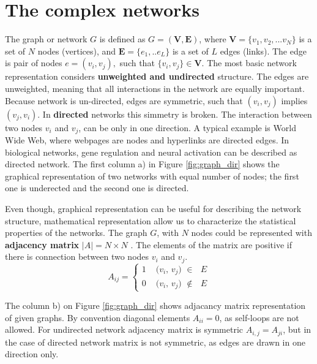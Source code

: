 \section{The complex networks}

The graph or network $G$ is defined as $G=(\boldsymbol{V}, \boldsymbol{E})$, where $\boldsymbol{V} = \{ v_1, v_2, ... v_N\}$ is a set of $N$ nodes (vertices), and  $\boldsymbol{E} = \{e_1, .. e_L\}$ is a set of $L$ edges (links). The edge is pair of nodes $e = (v_i, v_j), $ such that $\{v_i,v_j\}\in \boldsymbol{V}$. The most basic network representation considers \textbf{unweighted and undirected} structure. The edges are unweighted, meaning that all interactions in the network are equally important.  Because network is un-directed, edges are symmetric, such that $(v_i, v_j)$ implies $(v_j, v_i)$. In \textbf{directed} networks this simmetry is broken. The interaction between two nodes $v_i$ and $v_j$, can be only in one direction. A typical example is World Wide Web, where webpages are nodes and hyperlinks are directed edges. In biological networks, gene regulation and neural activation can be described as directed network. The first column a) in Figure \ref{fig:graph_dir} shows the graphical representation of two networks with equal number of nodes; the first one is underected and the second one is directed. 

Even though, graphical representation can be useful for describing the network structure, mathematical representation allow us to characterize the statistical properties of the networks. The graph $G$, with $N$ nodes could be represented with \textbf{adjacency matrix} $|A| = N \times N$ \cite{boccaletti2006complex}. The elements of the matrix are positive if there is connection between two nodes $v_i$ and $v_j$. 
\begin{equation}
A_{ij} =
\begin{cases}
1 & \text{ ($v_i$, $v_j$) $\in$ $E$}\\
0 & \text{ ($v_i$, $v_j$) $\notin$ $E$}
\end{cases}       
\end{equation}

The column b) on Figure \ref{fig:graph_dir} shows adjacancy matrix representation of given graphs. By convention diagonal elements $A_{ii}=0$, as self-loops are not allowed. For undirected network adjacency matrix is symmetric $A_{i,j}=A_{ji}$, but in the case of directed network matrix is not symmetric, as edges are drawn in one direction only.  

